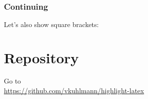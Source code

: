 \documentclass[handout]{beamer}
\begin{document}

%		
%			

\begin{frame}
	\frametitle{Continuing}
	Let's also show square brackets:
	
	
	\pause
	
	\pause
\end{frame}

%			
%
%	
%				
	
	\section{Repository}
	\begin{frame}
		\begin{center}
			{\Large Go to}\\
			\url{https://github.com/vkuhlmann/highlight-latex}
		\end{center}
	\end{frame}
	
\end{document}
